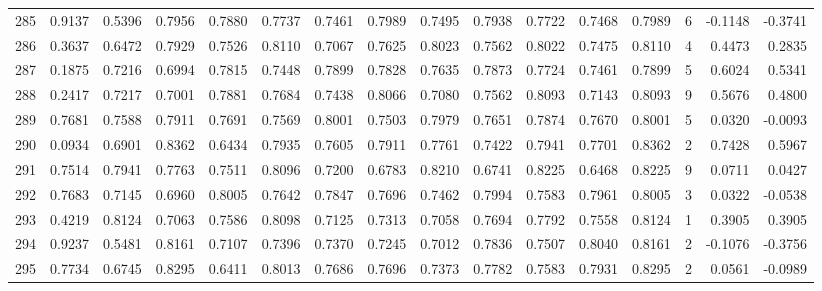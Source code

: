 \begin{tabular}{lrrrrrrrrrrrrrrr}
285 &      0.9137 &  0.5396 &  0.7956 &  0.7880 &  0.7737 &  0.7461 &  0.7989 &  0.7495 &  0.7938 &  0.7722 &   0.7468 &     0.7989 &      6 &                   -0.1148 &                    -0.3741 \\
286 &      0.3637 &  0.6472 &  0.7929 &  0.7526 &  0.8110 &  0.7067 &  0.7625 &  0.8023 &  0.7562 &  0.8022 &   0.7475 &     0.8110 &      4 &                    0.4473 &                     0.2835 \\
287 &      0.1875 &  0.7216 &  0.6994 &  0.7815 &  0.7448 &  0.7899 &  0.7828 &  0.7635 &  0.7873 &  0.7724 &   0.7461 &     0.7899 &      5 &                    0.6024 &                     0.5341 \\
288 &      0.2417 &  0.7217 &  0.7001 &  0.7881 &  0.7684 &  0.7438 &  0.8066 &  0.7080 &  0.7562 &  0.8093 &   0.7143 &     0.8093 &      9 &                    0.5676 &                     0.4800 \\
289 &      0.7681 &  0.7588 &  0.7911 &  0.7691 &  0.7569 &  0.8001 &  0.7503 &  0.7979 &  0.7651 &  0.7874 &   0.7670 &     0.8001 &      5 &                    0.0320 &                    -0.0093 \\
290 &      0.0934 &  0.6901 &  0.8362 &  0.6434 &  0.7935 &  0.7605 &  0.7911 &  0.7761 &  0.7422 &  0.7941 &   0.7701 &     0.8362 &      2 &                    0.7428 &                     0.5967 \\
291 &      0.7514 &  0.7941 &  0.7763 &  0.7511 &  0.8096 &  0.7200 &  0.6783 &  0.8210 &  0.6741 &  0.8225 &   0.6468 &     0.8225 &      9 &                    0.0711 &                     0.0427 \\
292 &      0.7683 &  0.7145 &  0.6960 &  0.8005 &  0.7642 &  0.7847 &  0.7696 &  0.7462 &  0.7994 &  0.7583 &   0.7961 &     0.8005 &      3 &                    0.0322 &                    -0.0538 \\
293 &      0.4219 &  0.8124 &  0.7063 &  0.7586 &  0.8098 &  0.7125 &  0.7313 &  0.7058 &  0.7694 &  0.7792 &   0.7558 &     0.8124 &      1 &                    0.3905 &                     0.3905 \\
294 &      0.9237 &  0.5481 &  0.8161 &  0.7107 &  0.7396 &  0.7370 &  0.7245 &  0.7012 &  0.7836 &  0.7507 &   0.8040 &     0.8161 &      2 &                   -0.1076 &                    -0.3756 \\
295 &      0.7734 &  0.6745 &  0.8295 &  0.6411 &  0.8013 &  0.7686 &  0.7696 &  0.7373 &  0.7782 &  0.7583 &   0.7931 &     0.8295 &      2 &                    0.0561 &                    -0.0989 \\

\end{tabular}
